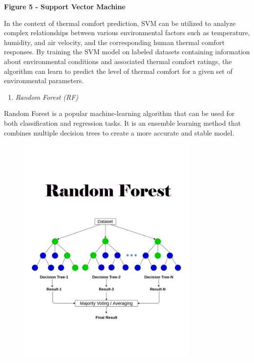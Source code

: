{\bfseries Figure 5 - Support Vector Machine}

In the context of thermal comfort prediction, SVM can be utilized to
analyze complex relationships between various environmental factors such
as temperature, humidity, and air velocity, and the corresponding human
thermal comfort responses. By training the SVM model on labeled datasets
containing information about environmental conditions and associated
thermal comfort ratings, the algorithm can learn to predict the level of
thermal comfort for a given set of environmental parameters.

\begin{enumerate}
\def\labelenumi{\Alph{enumi}.}
\setcounter{enumi}{6}
\item
  \emph{Random Forest (RF)}
\end{enumerate}

Random Forest is a popular machine-learning algorithm that can be used
for both classification and regression tasks. It is an ensemble learning
method that combines multiple decision trees to create a more accurate
and stable model.

\begin{figure}[H]
	\centering
	\includegraphics[width=0.8\textwidth]{media/ict/image22}
	\caption*{}
\end{figure}


